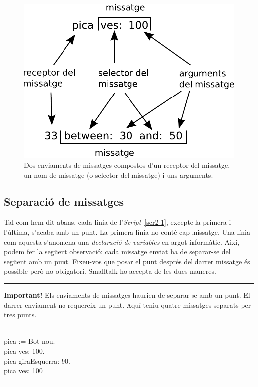 \begin{figure}[h]
\begin{center}
\includegraphics[scale=0.6]{Imatges/figura2-4}
\end{center}
\caption{Dos enviaments de missatges compostos d'un receptor del missatge, un nom de missatge (o selector del missatge) i uns arguments.}
\label{fig0204}
\end{figure}

\subsection{Separació de missatges}
Tal com hem dit abans, cada línia de l'\emph{Script}~\ref{scr2-1}, excepte la primera i l'última, s'acaba amb un punt. La primera línia no conté cap missatge. Una línia com aquesta s'anomena una \emph{declaració de variables} en argot informàtic. Així, podem fer la següent observació: cada missatge enviat ha de separar-se del següent amb un punt. Fixeu-vos que posar el punt després del darrer missatge és possible però no obligatori. Smalltalk ho accepta de les dues maneres. 

\vspace{3mm}
\noindent
\rule{\textwidth}{2pt}
\noindent
\textbf{Important!} Els enviaments de missatges haurien de separar-se amb un punt. El darrer enviament no requereix un punt. Aquí teniu quatre missatges separats per tres punts.

\noindent
\textsf{\upshape
\\
pica := Bot nou.\\
pica ves: 100.\\
pica giraEsquerra: 90.\\
pica ves: 100\\
}
\noindent
\rule{\textwidth}{2pt}

